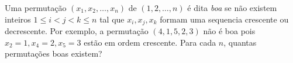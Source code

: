 Uma permutação $(x_1, x_2, \dots, x_n)$ de $(1, 2, \dots, n)$ é dita \emph{boa} se não existem inteiros
$1 \le i < j < k \le n$
tal que $x_i, x_j, x_k$ formam uma sequencia crescente ou decrescente.
Por exemplo, a permutação $(4, 1, 5, 2, 3)$ não é boa pois $x_2 = 1, x_4 = 2, x_5 = 3$ estão em ordem crescente.
Para cada $n$, quantas permutações boas existem?
